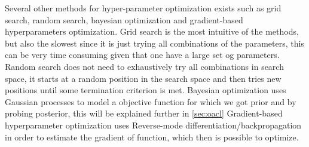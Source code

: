Several other methods for hyper-parameter optimization exists such as grid search, random search, bayesian optimization and gradient-based hyperparameters optimization. Grid search is the most intuitive of the methods, but also the slowest since it is just trying all combinations of the parameters, this can be very time consuming given that one have a large set og parameters. Random search does not need to exhaustively try all combinations in search space, it starts at a random position in the search space and then tries new positions until some termination criterion is met. Bayesian optimization uses Gaussian processes to model a objective function for which we got prior and by probing posterior, this will be explained further in \cref{sec:oacl} Gradient-based hyperparameter optimization uses Reverse-mode differentiation/backpropagation in order to estimate the gradient of function, which then is possible to optimize.
